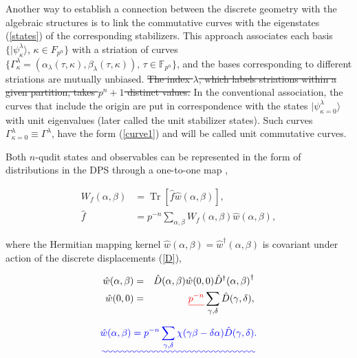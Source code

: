 \documentclass[quantumrep,article,submit,pdftex,moreauthors]{Definitions/mdpi}
\DeclareMathOperator{\Tr}{Tr}
\providecommand{\DIFadd}[1]{{\protect\color{blue}\uwave{#1}}} %
\providecommand{\DIFdel}[1]{{\protect\color{red}\sout{#1}}}                      %
\providecommand{\DIFaddbegin}{} %
\providecommand{\DIFaddend}{} %
\providecommand{\DIFdelbegin}{} %
\providecommand{\DIFdelend}{} %
\begin{document}
Another way to establish a connection between the discrete geometry with the
algebraic structures is to link the commutative curves with the eigenstates
(\ref{states}) of the corresponding stabilizers. This approach associates each
basis $\{|\psi_{\kappa}^{\lambda}\rangle $, $\kappa \in F_{p^{n}}\}$ with a
striation of curves $\{\Gamma_{\kappa}^{\lambda} = \left(
\alpha_{\lambda}(\tau,\kappa),\beta_{\lambda}(\tau,\kappa)\right) ,\,\tau \in
\mathbb{F}_{p^{n}}\}$, and the bases corresponding to different striations are
mutually unbiased. \DIFdelbegin \DIFdel{The index
$\lambda$, which labels striations within a given partition, takes $p^{n}+1$
distinct values. }\DIFdelend In the conventional association, the curves that include the
origin are put in correspondence with the states $|\psi_{\kappa =
0}^{\lambda}\rangle$ with unit eigenvalues (later called the unit stabilizer
states). Such curves $\Gamma_{\kappa=0}^{\lambda} \equiv \Gamma^{\lambda}$,
have the form (\ref{curve1}) and will be called unit commutative curves. 

Both $n$-qudit states and observables can be represented in the form of
distributions in the DPS through a one-to-one map
\cite{gross,DFW2-1,DFW2-2,DFW2-3,DFW2-4},

\begin{align}
  W_{f}\left( \alpha,\beta \right)
  &= \Tr\left[ \hat{f}\hat{w}\left( \alpha,\beta \right) \right],
  \label{map} \\
  \hat{f}
  &= p^{-n}\sum_{\alpha,\beta } W_{f}(\alpha,\beta) \hat{w}(\alpha,\beta),
\end{align}

where the Hermitian mapping kernel $\hat{w}\left( \alpha,\beta \right) =
\hat{w}^{\dagger}(\alpha,\beta)$ is covariant under action of the discrete
displacements (\ref{D}), \DIFaddbegin \DIFadd{and is defined as
 
}\DIFaddend 

\begin{eqnarray}
  \hat{w}\left( \alpha,\beta \right)
  &=& \hat{D}\left( \alpha,\beta \right) 
  \hat{w}\left( 0,0\right) \hat{D}^{\dagger} \left( \alpha,\beta \right) ^{\dagger }
  \label{Ds} \\
  \hat{w}\left( 0,0\right)
  &=& \DIFdelbegin \DIFdel{p^{-n} }\DIFdelend \sum_{\gamma,\delta}\hat{D}(\gamma,\delta),
  \label{Dw0}
\end{eqnarray}

\DIFaddbegin \DIFadd{so that

}

\begin{equation}
  \DIFadd{\hat{w} \left( \alpha,\beta \right)
  = p^{-n} \sum_{\gamma,\delta}
  \chi(\gamma\beta-\delta\alpha) \hat{D}(\gamma,\delta).
  \label{wabD}
}\end{equation}
\end{document}
